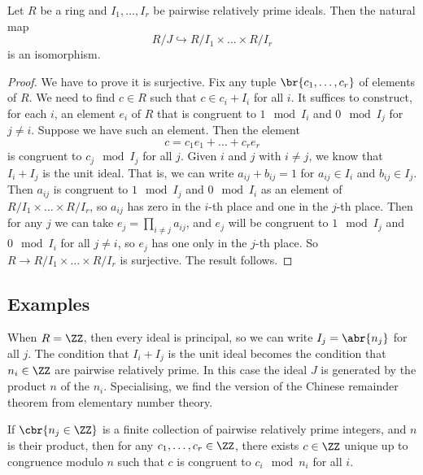 \begin{theorem}
Let $ R $ be a ring and $ I_1, \dots, I_r $ be pairwise relatively prime ideals. Then the natural map
$$ R / J \hookrightarrow R / I_1 \times \dots \times R / I_r $$
is an isomorphism.
\end{theorem}

\begin{proof}
We have to prove it is surjective. Fix any tuple $ \br{c_1, \dots, c_r} $ of elements of $ R $. We need to find $ c \in R $ such that $ c \in c_i + I_i $ for all $ i $. It suffices to construct, for each $ i $, an element $ e_i $ of $ R $ that is congruent to $ 1 \mod I_i $ and $ 0 \mod I_j $ for $ j \ne i $. Suppose we have such an element. Then the element
$$ c = c_1e_1 + \dots + c_re_r $$
is congruent to $ c_j \mod I_j $ for all $ j $. Given $ i $ and $ j $ with $ i \ne j $, we know that $ I_i + I_j $ is the unit ideal. That is, we can write $ a_{ij} + b_{ij} = 1 $ for $ a_{ij} \in I_i $ and $ b_{ij} \in I_j $. Then $ a_{ij} $ is congruent to $ 1 \mod I_j $ and $ 0 \mod I_i $ as an element of $ R / I_1 \times \dots \times R / I_r $, so $ a_{ij} $ has zero in the $ i $-th place and one in the $ j $-th place. Then for any $ j $ we can take $ e_j = \prod_{i \ne j} a_{ij} $, and $ e_j $ will be congruent to $ 1 \mod I_j $ and $ 0 \mod I_i $ for all $ j \ne i $, so $ e_j $ has one only in the $ j $-th place. So $ R \to R / I_1 \times \dots \times R / I_r $ is surjective. The result follows.
\end{proof}

\subsection{Examples}

When $ R = \ZZ $, then every ideal is principal, so we can write $ I_j = \abr{n_j} $ for all $ j $. The condition that $ I_i + I_j $ is the unit ideal becomes the condition that $ n_i \in \ZZ $ are pairwise relatively prime. In this case the ideal $ J $ is generated by the product $ n $ of the $ n_i $. Specialising, we find the version of the Chinese remainder theorem from elementary number theory.

\begin{theorem}
If $ \cbr{n_j \in \ZZ} $ is a finite collection of pairwise relatively prime integers, and $ n $ is their product, then for any $ c_1, \dots, c_r \in \ZZ $, there exists $ c \in \ZZ $ unique up to congruence modulo $ n $ such that $ c $ is congruent to $ c_i \mod n_i $ for all $ i $.
\end{theorem}

